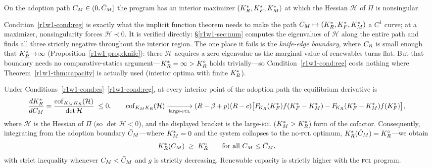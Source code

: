 \begin{condition}[Regularity]\label{r1w1-cond:reg}
On the adoption path $C_M\in(0,\bar C_M]$ the program has an interior maximizer
$(K_R^{*},K_F^{*},K_M^{*})$ at which the Hessian $\mathcal H$ of $\Pi$ is nonsingular.
\end{condition}

\noindent Condition~\ref{r1w1-cond:reg} is exactly what the implicit function theorem
needs to make the path $C_M\mapsto(K_R^{*},K_F^{*},K_M^{*})$ a $C^1$ curve; at a maximizer,
nonsingularity forces $\mathcal H\prec0$. It is verified directly:
\S\ref{r1w1-sec:num} computes the eigenvalues of $\mathcal H$ along the entire path and
finds all three strictly negative throughout the interior region. The one place it
fails is the \emph{knife-edge boundary}, where $C_R$ is small enough that
$K_R^{*}\!\to\!\infty$ (Proposition~\ref{r1w1-prop:knife}): there $\mathcal H$ acquires a
zero eigenvalue as the marginal value of renewables turns flat. But that boundary
needs no comparative-statics argument---$K_R^{*}=\infty>K_R^{\circ}$ holds trivially---so
Condition~\ref{r1w1-cond:reg} costs nothing where Theorem~\ref{r1w1-thm:capacity} is actually
used (interior optima with finite $K_R^{*}$).

\begin{theorem}\label{r1w1-thm:capacity}
Under Conditions~\ref{r1w1-cond:cs}--\ref{r1w1-cond:reg}, at every interior point of the
adoption path the equilibrium derivative is
\begin{equation}\label{r1w1-eq:dKRdCM}
  \frac{dK_R^{*}}{dC_M}
  =\frac{\operatorname{cof}_{K_MK_R}(\mathcal H)}{\det\mathcal H}\;\le 0,
  \qquad
  \operatorname{cof}_{K_MK_R}(\mathcal H)\xrightarrow[\text{large-\textsc{fcl}}]{}
  (R-\beta+p)(R-c)\big[F_{\!K_R}(K_F^{*})f(K_F^{*}-K_M^{*})-F_{\!K_R}(K_F^{*}-K_M^{*})f(K_F^{*})\big],
\end{equation}
where $\mathcal H$ is the Hessian of $\Pi$ (so $\det\mathcal H<0$), and the
displayed bracket is the large-\textsc{fcl} ($K_M^{*}>K_R^{*}$) form of the cofactor.
Consequently, integrating from the adoption boundary $\bar C_M$---where $K_M^{*}=0$ and
the system collapses to the no-\textsc{fcl} optimum, $K_R^{*}(\bar C_M)=K_R^{\circ}$---we
obtain
\begin{equation}
  K_R^{*}(C_M)\;\ge\;K_R^{\circ}\qquad\text{for all }C_M\le\bar C_M,
\end{equation}
with strict inequality whenever $C_M<\bar C_M$ and $g$ is strictly decreasing.
Renewable capacity is strictly higher with the \textsc{fcl} program.
\end{theorem}

